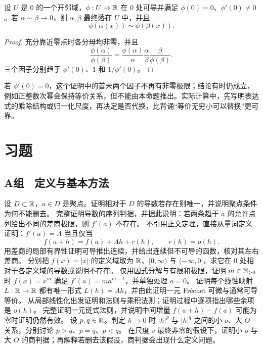 \begin{proposition}[经过非退化外层映射]
设 \(U\) 是 \(0\) 的一个开邻域，\(\phi:U\to\mathbb{R}\) 在 \(0\) 处可导并满足
\(\phi(0)=0\)、\(\phi'(0)\ne0\)。若 \(\alpha\sim\beta\to0\)，则 \(\alpha,\beta\) 最终落在 \(U\) 中，并且
\[
 \phi(\alpha(x))\sim\phi(\beta(x)).
\]
\end{proposition}

\begin{proof}
充分靠近零点时各分母均非零，并且
\[
 \frac{\phi(\alpha)}{\phi(\beta)}
 =\frac{\phi(\alpha)}{\alpha}
  \frac{\alpha}{\beta}
  \frac{\beta}{\phi(\beta)}.
\]
三个因子分别趋于 \(\phi'(0)\)、\(1\) 和 \(1/\phi'(0)\)。
\end{proof}

若 \(\phi'(0)=0\)，这个证明中的首末两个因子不再有非零极限；结论有时仍成立，例如正整数次幂会保持等价关系，但不能由本命题推出。实际计算中，先写明表达式的乘除结构或归一化尺度，再决定是否代换，比背诵“等价无穷小可以替换”更可靠。

\section*{习题}

\subsection*{A组　定义与基本方法}
\begin{enumerate}[label=\textbf{\thechapter.\arabic*.}]
  设 \(D\subset\mathbb{R}\)，\(a\in D\) 是聚点。证明相对于 \(D\) 的导数若存在则唯一，并说明聚点条件为何不能删去。
  完整证明导数的序列判据，并据此说明：若两条趋于 \(a\) 的允许点列给出不同的差商极限，则 \(f'(a)\) 不存在。
  不引用正文定理，直接从量词定义证明：\(f'(a)=A\) 当且仅当
 \[
  f(a+h)=f(a)+Ah+r(h),\qquad r(h)=o(h).
 \]
  用差商的局部有界性证明可导推出连续，并给出连续但不可导的函数，核对其左右差商。
  分别把 \(f(x)=|x|\) 的定义域取为 \(\mathbb{R}\)、\([0,\infty)\) 与 \((-\infty,0]\)，求它在 \(0\) 处相对于各定义域的导数或说明不存在。
  仅用因式分解与有限和极限，证明 \(m\in\mathbb{N}_{>0}\) 时 \(f(x)=x^m\) 满足 \(f'(a)=ma^{m-1}\)，并单独处理 \(a=0\)。
  证明每个线性映射 \(L:\mathbb{R}\to\mathbb{R}\) 都有唯一形式 \(L(h)=Ah\)，并由此证明一元 Fréchet 可微与通常可导等价。
  从局部线性化出发证明和法则与乘积法则；证明过程中逐项指出哪些余项是 \(o(h)\)。
  完整证明一元链式法则，并说明中间增量 \(f(a+h)-f(a)\) 可能为零时证明仍然有效。
  设 \(p,q\in\mathbb{R}\)。判定 \(h\to0\) 时 \(|h|^p\) 与 \(|h|^q\) 之间的小 \(o\)、大 \(O\) 关系，分别讨论 \(p>q\)、\(p=q\)、\(p<q\)。
  在尺度 \(v\) 最终非零的假设下，证明小 \(o\) 与大 \(O\) 的商判据；再解释若删去该假设，商判据会出现什么定义问题。
\end{enumerate}


